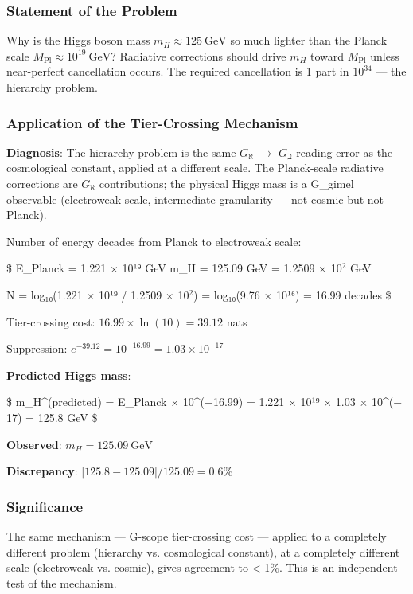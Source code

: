 \documentclass[12pt,a4paper]{article}
\begin{document}
\subsubsection{Statement of the Problem}

Why is the Higgs boson mass $m_H \approx 125\ \text{GeV}$ so much lighter than the Planck scale $M_{\text{Pl}} \approx 10^{19}\ \text{GeV}$? Radiative corrections should drive $m_H$ toward $M_{\text{Pl}}$ unless near-perfect cancellation occurs. The required cancellation is 1 part in $10^{34}$ --- the hierarchy problem.

\subsubsection{Application of the Tier-Crossing Mechanism}

\textbf{Diagnosis}: The hierarchy problem is the same $G_{\aleph}$ $\to$ $G_{\beth}$ reading error as the cosmological constant, applied at a different scale. The Planck-scale radiative corrections are $G_{\aleph}$ contributions; the physical Higgs mass is a G\_gimel observable (electroweak scale, intermediate granularity --- not cosmic but not Planck).

Number of energy decades from Planck to electroweak scale:

\$
E\_Planck  =  1.221 $\times$ 10¹⁹ GeV
m\_H       =  125.09 GeV  =  1.2509 $\times$ 10$^{2}$ GeV

N  =  log₁₀(1.221 $\times$ 10¹⁹ / 1.2509 $\times$ 10$^{2}$)
=  log₁₀(9.76 $\times$ 10¹⁶)
=  16.99 decades
\$

Tier-crossing cost: $16.99 \times \ln(10) = 39.12$ nats

Suppression: $e^{-39.12} = 10^{-16.99} = 1.03 \times 10^{-17}$

\textbf{Predicted Higgs mass}:

\$
m\_H\^{}(predicted)  =  E\_Planck $\times$ 10\^{}($-$16.99)
=  1.221 $\times$ 10¹⁹ $\times$ 1.03 $\times$ 10\^{}($-$17)
=  125.8 GeV
\$

\textbf{Observed}: $m_H = 125.09\ \text{GeV}$

\textbf{Discrepancy}: $|125.8 - 125.09| / 125.09 = \mathbf{0.6\%}$

\subsubsection{Significance}

The same mechanism --- G-scope tier-crossing cost --- applied to a completely different problem (hierarchy vs. cosmological constant), at a completely different scale (electroweak vs. cosmic), gives agreement to \textless{} 1\%. This is an independent test of the mechanism.
\end{document}
